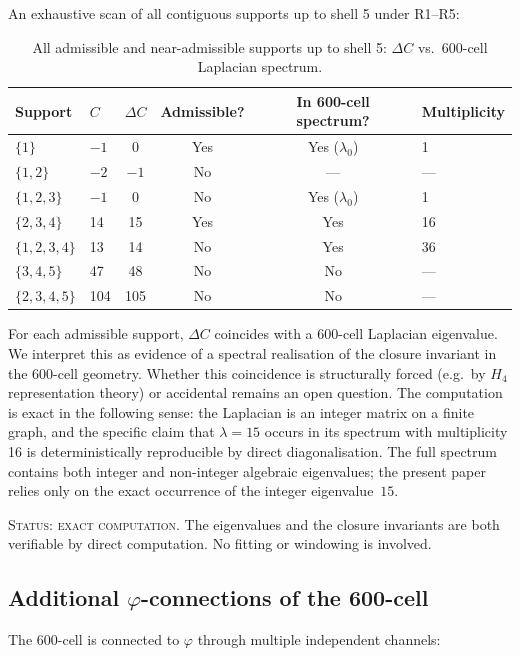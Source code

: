 \documentclass[12pt]{article}
\newcommand{\phig}{\varphi}
\begin{document}
An exhaustive scan of all contiguous supports up to shell 5 under R1--R5:

\begin{table}[ht]
\centering
\caption{All admissible and near-admissible supports up to shell 5: $\Delta C$ vs.\ 600-cell Laplacian spectrum.}
\label{tab:finitescan}
\begin{tabular}{@{}llcccl@{}}
\toprule
Support & $C$ & $\Delta C$ & Admissible? & In 600-cell spectrum? & Multiplicity \\
\midrule
$\{1\}$ & $-1$ & 0 & Yes & Yes ($\lambda_0$) & 1 \\
$\{1,2\}$ & $-2$ & $-1$ & No & --- & --- \\
$\{1,2,3\}$ & $-1$ & 0 & No & Yes ($\lambda_0$) & 1 \\
$\{2,3,4\}$ & 14 & 15 & Yes & Yes & 16 \\
$\{1,2,3,4\}$ & 13 & 14 & No & Yes & 36 \\
$\{3,4,5\}$ & 47 & 48 & No & No & --- \\
$\{2,3,4,5\}$ & 104 & 105 & No & No & --- \\
\bottomrule
\end{tabular}
\end{table}

For each admissible support, $\Delta C$ coincides with a 600-cell Laplacian eigenvalue. We interpret this as evidence of a spectral realisation of the closure invariant in the 600-cell geometry. Whether this coincidence is structurally forced (e.g.\ by $H_4$ representation theory) or accidental remains an open question. The computation is exact in the following sense: the Laplacian is an integer matrix on a finite graph, and the specific claim that $\lambda = 15$ occurs in its spectrum with multiplicity 16 is deterministically reproducible by direct diagonalisation. The full spectrum contains both integer and non-integer algebraic eigenvalues; the present paper relies only on the exact occurrence of the integer eigenvalue~$15$.

\textsc{Status: exact computation.} The eigenvalues and the closure invariants are both verifiable by direct computation. No fitting or windowing is involved.

\subsection{Additional $\phig$-connections of the 600-cell}

The 600-cell is connected to $\phig$ through multiple independent channels:
\end{document}
